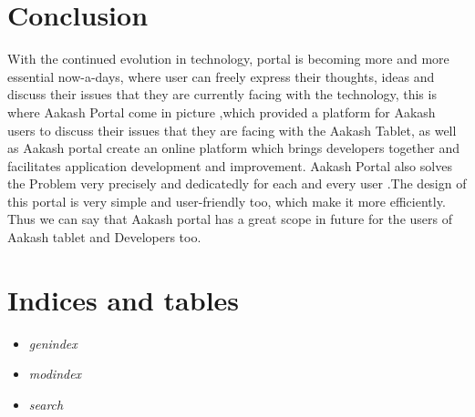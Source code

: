 \documentclass[letterpaper,10pt,english]{sphinxmanual}
\begin{document}
\chapter{Conclusion}
\label{conclusion::doc}\label{conclusion:conclusion}
With the continued evolution in technology, portal is becoming more and more essential now-a-days, where user can freely express their thoughts, ideas and discuss their issues that they are currently facing with the technology, this is where Aakash Portal come in picture ,which provided a platform for Aakash users to discuss their issues that they are facing with the Aakash Tablet, as well as Aakash portal create an online platform which brings developers together and facilitates application development and improvement. Aakash Portal also solves the Problem very precisely and dedicatedly for each and every user .The design of this portal is very simple and user-friendly too, which make it more efficiently. Thus we can say that Aakash portal has a great scope in future for the users of Aakash tablet and Developers too.


\chapter{Indices and tables}
\label{index:indices-and-tables}\begin{itemize}
\item {} 
\emph{genindex}

\item {} 
\emph{modindex}

\item {} 
\emph{search}

\end{itemize}



\renewcommand{\indexname}{Index}
\printindex
\end{document}
